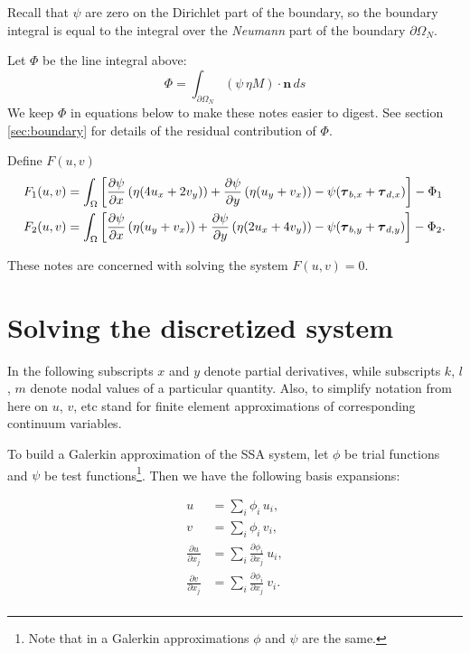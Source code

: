 \documentclass{amsart}
\newcommand{\N}{\mathbf{n}}
\newcommand{\T}{\boldsymbol{\tau}}
\newcommand{\I}{\ensuremath{\int_{\Omega}}}
\newcommand{\boundary}{\partial \Omega_N}
\newcommand{\bI}{\ensuremath{\int_{\boundary}}}
\newcommand{\etaM}{\ensuremath{\eta M}}
\newcommand{\diff}[2]{\ensuremath{\frac{\partial #1}{\partial #2}}}
\newcommand{\basalshearstress}[1]{\T_{b#1}}
\newcommand{\taubx}{\basalshearstress{,x}}
\newcommand{\tauby}{\basalshearstress{,y}}
\newcommand{\drivingstress}[1]{\T_{d#1}}
\newcommand{\taudx}{\drivingstress{,x}}
\newcommand{\taudy}{\drivingstress{,y}}
\begin{document}
Recall that $\psi$ are zero on the Dirichlet part of the boundary, so the boundary integral is equal to the integral over the \emph{Neumann} part of the boundary $\boundary$.

Let $\Phi$ be the line integral above:
\begin{equation}
  \label{eq:9}
  \Phi = \bI (\psi\, \etaM) \cdot \N\, ds
\end{equation}
We keep $\Phi$ in equations below to make these notes easier to digest. See section \ref{sec:boundary} for details of the residual contribution of $\Phi$.

Define $F(u,v)$
\begin{align}
  \label{eq:10}
  F_{1}(u,v) &=  \I \left[ \diff{\psi}{x} \left( \eta (\Mux) \right) + \diff{\psi}{y} \left( \eta (\Muy) \right) - \psi (\taubx + \taudx) \right] - \Phi_{1}\\
  \label{eq:11}
  F_{2}(u,v) &= \I \left[ \diff{\psi}{x} \left( \eta (\Mvx) \right) + \diff{\psi}{y} \left( \eta (\Mvy) \right) - \psi (\tauby + \taudy) \right] - \Phi_{2}.
\end{align}

These notes are concerned with solving the system $F(u,v) = 0$.

\section{Solving the discretized system}
\label{sec-3}

In the following subscripts $x$ and $y$ denote partial derivatives, while subscripts $k$, $l$, $m$ denote nodal values of a particular quantity. Also, to simplify notation from here on $u$, $v$, etc stand for finite element approximations of corresponding continuum variables.

To build a Galerkin approximation of the SSA system, let $\phi$ be trial functions and $\psi$ be test functions\footnote{Note that in a Galerkin approximations $\phi$ and $\psi$ are the same.}. Then we have the following basis expansions:

\begin{equation}
  \label{eq:12}
  \begin{aligned}
    u & = \sum_i \phi_i\, u_i, \\
    v & = \sum_i \phi_i\, v_i,\\
    \diff{u}{x_j} & = \sum_i \diff{\phi_i}{x_j}\ u_i,\\
    \diff{v}{x_j} & = \sum_i \diff{\phi_i}{x_j}\ v_i.\\
  \end{aligned}
\end{equation}
\end{document}
